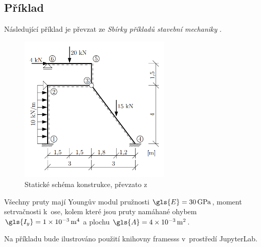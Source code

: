 \subsection{Příklad} \label{sec:framesss_example}

Následující příklad je převzat ze \textit{Sbírky příkladů stavební mechaniky} \cite[Příklad 5.2]{sbirka_prikladu}.

\begin{figure}[H]
    \includegraphics[height=7cm]{assets/figures/framesss/example_snk.png}
    \caption[Statické schéma konstrukce]{Statické schéma konstrukce, převzato z~\cite[Příklad 5.2]{sbirka_prikladu}}
    \label{fig:framesss_example}
\end{figure}

Všechny pruty mají Youngův modul pružnosti $\gls{E} = \SI{30}{\GPa}$, moment setrvačnosti k~ose, kolem které jsou pruty namáhané ohybem $\gls{I_y} = \SI{1e-3}{\unit{\metre\tothe{4}}}$ a plochu $\gls{A}= \SI{4e-3}{{\metre\tothe{2}}}$.

Na příkladu bude ilustrováno použití knihovny framesss v~prostředí JupyterLab.



